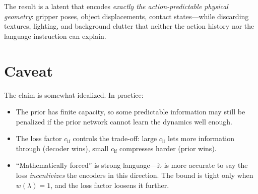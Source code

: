 \documentclass{article}
\begin{document}
The result is a latent that encodes \emph{exactly the action-predictable physical geometry}:
gripper poses, object displacements, contact states---while discarding textures, lighting, and background clutter that neither the action history nor the language instruction can explain.

\section{Caveat}

The claim is somewhat idealized. In practice:
\begin{itemize}[leftmargin=*]
  \item The prior has finite capacity, so some predictable information may still be penalized if the prior network cannot learn the dynamics well enough.
  \item The loss factor $c_{\text{lf}}$ controls the trade-off: large $c_{\text{lf}}$ lets more information through (decoder wins), small $c_{\text{lf}}$ compresses harder (prior wins).
  \item ``Mathematically forced'' is strong language---it is more accurate to say the loss \emph{incentivizes} the encoders in this direction.
    The bound is tight only when $w(\lambda) = 1$, and the loss factor loosens it further.
\end{itemize}
\end{document}
